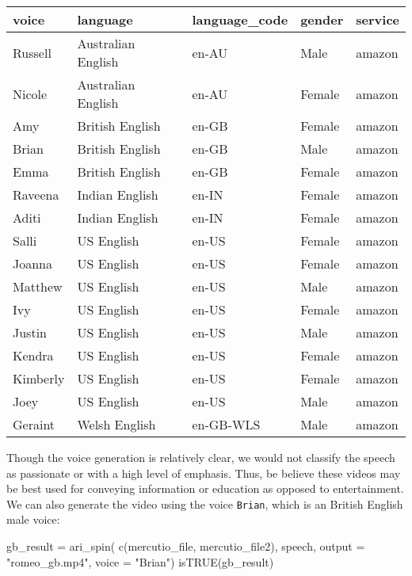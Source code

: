 \begin{Schunk}

\begin{tabular}{l|l|l|l|l}
\hline
voice & language & language\_code & gender & service\\
\hline
Russell & Australian English & en-AU & Male & amazon\\
\hline
Nicole & Australian English & en-AU & Female & amazon\\
\hline
Amy & British English & en-GB & Female & amazon\\
\hline
Brian & British English & en-GB & Male & amazon\\
\hline
Emma & British English & en-GB & Female & amazon\\
\hline
Raveena & Indian English & en-IN & Female & amazon\\
\hline
Aditi & Indian English & en-IN & Female & amazon\\
\hline
Salli & US English & en-US & Female & amazon\\
\hline
Joanna & US English & en-US & Female & amazon\\
\hline
Matthew & US English & en-US & Male & amazon\\
\hline
Ivy & US English & en-US & Female & amazon\\
\hline
Justin & US English & en-US & Male & amazon\\
\hline
Kendra & US English & en-US & Female & amazon\\
\hline
Kimberly & US English & en-US & Female & amazon\\
\hline
Joey & US English & en-US & Male & amazon\\
\hline
Geraint & Welsh English & en-GB-WLS & Male & amazon\\
\hline
\end{tabular}

\end{Schunk}

Though the voice generation is relatively clear, we would not classify
the speech as passionate or with a high level of emphasis. Thus, be
believe these videos may be best used for conveying information or
education as opposed to entertainment. We can also generate the video
using the voice \texttt{Brian}, which is an British English male voice:

\begin{Schunk}
\begin{Sinput}
gb_result = ari_spin(
  c(mercutio_file, mercutio_file2),
  speech, output = "romeo_gb.mp4", voice = "Brian")
isTRUE(gb_result)
\end{Sinput}
\end{Schunk}

